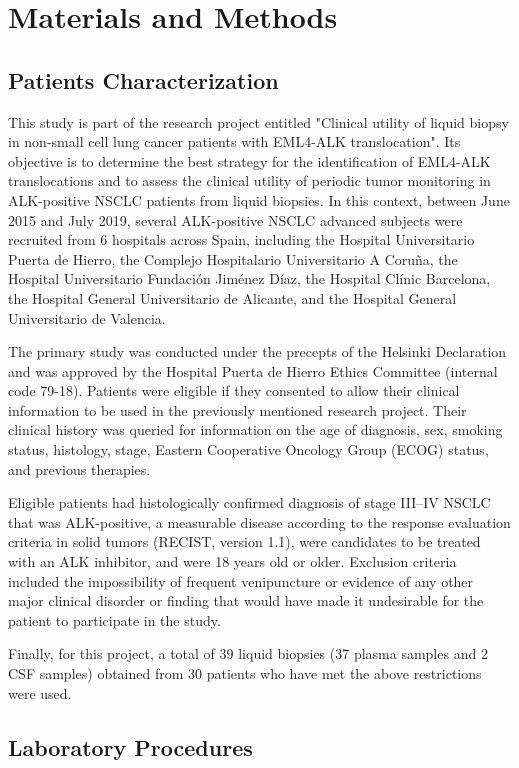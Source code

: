 \chapter{Materials and Methods}

\section{Patients Characterization}

This study is part of the research project entitled "Clinical utility of liquid biopsy in non-small cell lung cancer patients with EML4-ALK translocation". Its objective is to determine the best strategy for the identification of EML4-ALK translocations and to assess the clinical utility of periodic tumor monitoring in ALK-positive NSCLC patients from liquid biopsies. In this context, between June 2015 and July 2019, several ALK-positive NSCLC advanced subjects were recruited from 6 hospitals across Spain, including the Hospital Universitario Puerta de Hierro, the Complejo Hospitalario Universitario A Coruña, the Hospital Universitario Fundación Jiménez Díaz, the Hospital Clínic Barcelona, the Hospital General Universitario de Alicante, and the Hospital General Universitario de Valencia.

The primary study was conducted under the precepts of the Helsinki Declaration and was approved by the Hospital Puerta de Hierro Ethics Committee (internal code 79-18). Patients were eligible if they consented to allow their clinical information to be used in the previously mentioned research project. Their clinical history was queried for information on the age of diagnosis, sex, smoking status, histology, stage, Eastern Cooperative Oncology Group (ECOG) status, and previous therapies.

Eligible patients had histologically confirmed diagnosis of stage III–IV NSCLC that was ALK-positive, a measurable disease according to the response evaluation criteria in solid tumors (RECIST, version 1.1), were candidates to be treated with an ALK inhibitor, and were 18 years old or older. Exclusion criteria included the impossibility of frequent venipuncture or evidence of any other major clinical disorder or finding that would have made it undesirable for the patient to participate in the study.

Finally, for this project, a total of 39 liquid biopsies (37 plasma samples and 2 CSF samples) obtained from 30 patients who have met the above restrictions were used.

\section{Laboratory Procedures}

